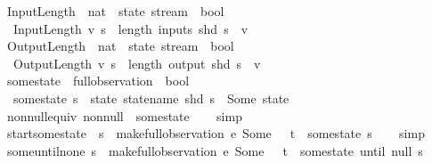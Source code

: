 \begin{isabellebody}
\isanewline
{}\isamarkupfalse%
\ InputLength\ {\isacharcolon}{\isacharcolon}\ {\isachardoublequoteopen}nat\ {\isasymRightarrow}\ state\ stream\ {\isasymRightarrow}\ bool{\isachardoublequoteclose}\ \isanewline
\ \ {\isachardoublequoteopen}InputLength\ v\ s\ {\isasymequiv}\ length\ {\isacharparenleft}inputs\ {\isacharparenleft}shd\ s{\isacharparenright}{\isacharparenright}\ {\isacharequal}\ v{\isachardoublequoteclose}\isanewline
\isanewline
{}\isamarkupfalse%
\ OutputLength\ {\isacharcolon}{\isacharcolon}\ {\isachardoublequoteopen}nat\ {\isasymRightarrow}\ state\ stream\ {\isasymRightarrow}\ bool{\isachardoublequoteclose}\ \isanewline
\ \ {\isachardoublequoteopen}OutputLength\ v\ s\ {\isasymequiv}\ length\ {\isacharparenleft}output\ {\isacharparenleft}shd\ s{\isacharparenright}{\isacharparenright}\ {\isacharequal}\ v{\isachardoublequoteclose}\isanewline
\isanewline
{}\isamarkupfalse%
\ some{\isacharunderscore}state\ {\isacharcolon}{\isacharcolon}\ {\isachardoublequoteopen}full{\isacharunderscore}observation\ {\isasymRightarrow}\ bool{\isachardoublequoteclose}\ \isanewline
\ \ {\isachardoublequoteopen}some{\isacharunderscore}state\ s\ {\isasymequiv}\ {\isacharparenleft}{\isasymexists}state{\isachardot}\ statename\ {\isacharparenleft}shd\ s{\isacharparenright}\ {\isacharequal}\ Some\ state{\isacharparenright}{\isachardoublequoteclose}\isanewline
\isanewline
{}\isamarkupfalse%
\ non{\isacharunderscore}null{\isacharunderscore}equiv{\isacharcolon}\ {\isachardoublequoteopen}non{\isacharunderscore}null\ {\isacharequal}\ some{\isacharunderscore}state{\isachardoublequoteclose}\isanewline
%
\isadelimproof
\ \ %
\endisadelimproof
%
\isatagproof
{}\isamarkupfalse%
\ simp%
\endisatagproof
{\isafoldproof}%
%
\isadelimproof
\isanewline
%
\endisadelimproof
\isanewline
{}\isamarkupfalse%
\ start{\isacharunderscore}some{\isacharunderscore}state{\isacharcolon}\ \ {\isachardoublequoteopen}s\ {\isacharequal}\ make{\isacharunderscore}full{\isacharunderscore}observation\ e\ {\isacharparenleft}Some\ {}{\isacharparenright}\ {\isacharless}{\isachargreater}\ t\ {\isasymLongrightarrow}\ some{\isacharunderscore}state\ s{\isachardoublequoteclose}\isanewline
%
\isadelimproof
\ \ %
\endisadelimproof
%
\isatagproof
{}\isamarkupfalse%
\ simp%
\endisatagproof
{\isafoldproof}%
%
\isadelimproof
\isanewline
%
\endisadelimproof
\isanewline
{}\isamarkupfalse%
\ some{\isacharunderscore}until{\isacharunderscore}none{\isacharcolon}\ {\isachardoublequoteopen}s\ {\isacharequal}\ make{\isacharunderscore}full{\isacharunderscore}observation\ e\ {\isacharparenleft}Some\ {}{\isacharparenright}\ {\isacharless}{\isachargreater}\ t\ {\isasymLongrightarrow}\ {\isacharparenleft}some{\isacharunderscore}state\ until\ null{\isacharparenright}\ s\ {\isachardoublequoteclose}\isanewline

\end{isabellebody}
